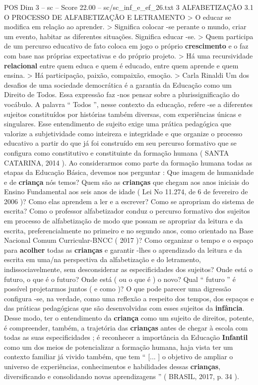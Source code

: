 \begin{textsample}{POS Dim 3 – sc – Score 22.00 – sc/sc\_inf\_e\_ef\_26.txt}  \label{ex:f3_pos_064}
3 ALFABETIZAÇÃO 3.1 O PROCESSO DE ALFABETIZAÇÃO E LETRAMENTO > O educar se modifica em relação ao aprender. > Significa colocar -se perante o mundo, criar um evento, habitar as diferentes situações.
Significa educar -se. > Quem participa de um percurso educativo de fato coloca em jogo o próprio \textbf{crescimento} e o faz com base nas próprias expectativas e do próprio projeto. > Há uma recursividade \textbf{relacional} entre quem educa e quem é educado, entre quem aprende e quem ensina. > Há participação, paixão, compaixão, emoção. > Carla Rinaldi Um dos desafios de uma sociedade democrática é a garantia da Educação como um Direito de Todos.
Essa expressão faz -nos pensar sobre a plurissignificação do vocábulo.
A palavra “ Todos ”, nesse contexto da educação, refere -se a diferentes sujeitos constituídos por histórias também diversas, com experiências únicas e singulares.
Esse entendimento de sujeito exige uma prática pedagógica que valorize a subjetividade como inteireza e integridade e que organize o processo educativo a partir do que já foi construído em seu percurso formativo que se configura como constitutivo e constituinte da formação humana ( SANTA CATARINA, 2014 ).
Ao considerarmos como parte da formação humana todas as etapas da Educação Básica, devemos nos perguntar : Que imagem de humanidade e de \textbf{criança} nós temos?
Quem são as \textbf{crianças} que chegam aos anos iniciais do Ensino Fundamental aos seis anos de idade ( Lei No 11.274, de 6 de fevereiro de 2006 )?
Como elas aprendem a ler e a escrever?
Como se apropriam do sistema de escrita?
Como o professor alfabetizador conduz o percurso formativo dos sujeitos em processo de alfabetização de modo que possam se apropriar da leitura e da escrita, preferencialmente no primeiro e no segundo anos, como orientado na Base Nacional Comum Curricular-BNCC ( 2017 )?
Como organizar o tempo e o espaço para \textbf{acolher} todas as \textbf{crianças} e garantir -lhes o aprendizado da leitura e da escrita em uma/na perspectiva da alfabetização e do letramento, indissociavelmente, sem desconsiderar as especificidades dos sujeitos?
Onde está o futuro, o que é o futuro?
Onde está ( ou o que é ) o novo?
Qual “ futuro ” é possível projetarmos juntos ( e como )?
O que pode parecer uma digressão configura -se, na verdade, como uma reflexão a respeito dos tempos, dos espaços e das práticas pedagógicas que são desenvolvidas com esses sujeitos da \textbf{infância}.
Desse modo, ter o entendimento da \textbf{criança} como um sujeito de direitos, potente, é compreender, também, a trajetória das \textbf{crianças} antes de chegar à escola com todas as suas especificidades ; é reconhecer a importância da Educação \textbf{Infantil} como um dos meios de potencializar a formação humana, haja vista ter um contexto familiar já vivido também, que tem “ [... ] o objetivo de ampliar o universo de experiências, conhecimentos e habilidades dessas \textbf{crianças}, diversificando e consolidando novas aprendizagens ” ( BRASIL, 2017, p. 34 ).

\end{textsample}
